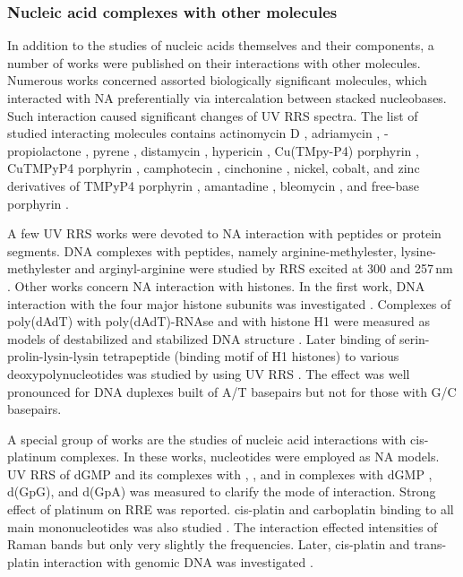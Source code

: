 \subsubsection{Nucleic acid complexes with other molecules}

In addition to the studies of nucleic acids themselves and their components, a
number of works were published on their interactions with other molecules.
Numerous works concerned assorted biologically significant molecules, which
interacted with NA preferentially via intercalation between stacked
nucleobases.
Such interaction caused significant changes of UV RRS spectra.
The list of studied interacting molecules contains actinomycin D
\parencite{Chinsky1978},
adriamycin
\parencite{Manfait1982},
-propiolactone
\parencite{Jolles1988},
pyrene
\parencite{Jones1988},
distamycin
\parencite{Grygon1989},
hypericin
\parencite{Miskovsky1995},
Cu(TMpy-P4) porphyrin
\parencite{Tomkova1995},
CuTMPyP4 porphyrin
\parencite{Wheeler1995},
camphotecin
\parencite{Feofanov1996},
cinchonine
\parencite{Weselucha-Birczynska1996},
nickel, cobalt, and zinc derivatives of TMPyP4 porphyrin
\parencite{Wheeler1997},
amantadine
\parencite{Stanicova1999},
bleomycin
\parencite{Weselucha-Birczynska2000},
and free-base  porphyrin
\parencite{Wei2006}.

A few UV RRS works were devoted to NA interaction with peptides or protein
segments.
DNA complexes with peptides, namely arginine-methylester, lysine-methylester
and arginyl-arginine were studied by RRS excited at 300 and 257\,nm
\parencite{Laigle1982a}.
Other works concern NA interaction with histones.
In the first work, DNA interaction with the four major histone subunits was
investigated
\parencite{Laigle1982b}.
Complexes of poly(dAdT) with poly(dAdT)-RNAse and with histone H1 were measured
as models of destabilized and stabilized DNA structure
\parencite{Chinsky1982a}.
Later binding of serin-prolin-lysin-lysin tetrapeptide (binding motif of H1
histones) to various deoxypolynucleotides was studied by using UV RRS
\parencite{Takeuchi1995}.
The effect was well pronounced for DNA duplexes built of A/T basepairs but not
for those with G/C basepairs.

A special group of works are the studies of nucleic acid interactions with
cis-platinum complexes.
In these works, nucleotides were employed as NA models.
UV RRS of dGMP and its complexes with , , and
 in complexes with dGMP
\parencite{Perno1987},
d(GpG), and d(GpA)
\parencite{Perno1988}
was measured to clarify the mode of interaction.
Strong effect of platinum on RRE was reported.
cis-platin and carboplatin binding to all main mononucleotides was also studied
\parencite{%
	Benson1992,%
	Benson1993%
}.
The interaction effected intensities of Raman bands but only very slightly the
frequencies.
Later, cis-platin and trans-platin interaction with genomic DNA was
investigated
\parencite{Geng2017}.
